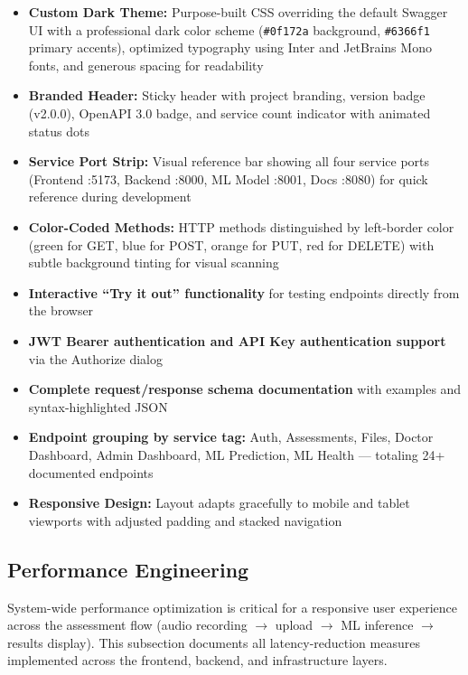 \documentclass[12pt]{article}
\begin{document}
	\begin{itemize}
		\item \textbf{Custom Dark Theme:} Purpose-built CSS overriding the default Swagger UI with a professional dark color scheme (\texttt{\#0f172a} background, \texttt{\#6366f1} primary accents), optimized typography using Inter and JetBrains Mono fonts, and generous spacing for readability
		\item \textbf{Branded Header:} Sticky header with project branding, version badge (v2.0.0), OpenAPI 3.0 badge, and service count indicator with animated status dots
		\item \textbf{Service Port Strip:} Visual reference bar showing all four service ports (Frontend :5173, Backend :8000, ML Model :8001, Docs :8080) for quick reference during development
		\item \textbf{Color-Coded Methods:} HTTP methods distinguished by left-border color (green for GET, blue for POST, orange for PUT, red for DELETE) with subtle background tinting for visual scanning
		\item \textbf{Interactive ``Try it out'' functionality} for testing endpoints directly from the browser
		\item \textbf{JWT Bearer authentication and API Key authentication support} via the Authorize dialog
		\item \textbf{Complete request/response schema documentation} with examples and syntax-highlighted JSON
		\item \textbf{Endpoint grouping by service tag:} Auth, Assessments, Files, Doctor Dashboard, Admin Dashboard, ML Prediction, ML Health --- totaling 24+ documented endpoints
		\item \textbf{Responsive Design:} Layout adapts gracefully to mobile and tablet viewports with adjusted padding and stacked navigation
	\end{itemize}


	\subsection{Performance Engineering}

	System-wide performance optimization is critical for a responsive user experience across the assessment flow (audio recording $\rightarrow$ upload $\rightarrow$ ML inference $\rightarrow$ results display). This subsection documents all latency-reduction measures implemented across the frontend, backend, and infrastructure layers.
\end{document}
